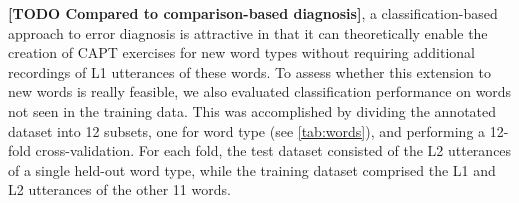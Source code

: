 \documentclass[a4paper]{article}
\newcommand{\TODO}[1]{{\color{red}\textbf{[TODO #1]}}}
\begin{document}
		\TODO{Compared to comparison-based diagnosis}, a classification-based approach to error diagnosis is attractive in that it can theoretically enable the creation of CAPT exercises for new word types without requiring additional recordings of L1 utterances of these words. 
		To assess whether this extension to new words is really feasible, we also evaluated classification performance on words not seen in the training data. This was accomplished by dividing the annotated dataset into 12 subsets, one for word type (see \cref{tab:words}), and performing a 12-fold cross-validation. For each fold, the test dataset consisted of the L2 utterances of a single held-out word type, while the training dataset comprised the L1 and L2 utterances of the other 11 words. 
		
\end{document}
